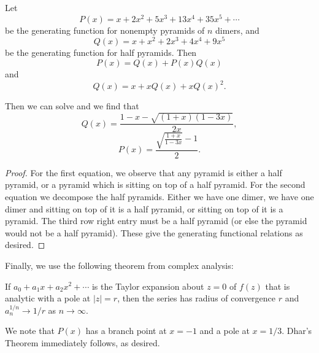 \begin{theorem}
Let 
\[P(x) = x + 2x^2 + 5x^3 + 13x^4 + 35x^5 + \cdots\] be the generating function for nonempty pyramids of $n$ dimers, and 
\[Q(x) = x + x^2 + 2x^3 + 4x^4 + 9x^5\]
be the generating function for half pyramids. Then
\[P(x) = Q(x) + P(x)Q(x)\] and
\[Q(x) = x + xQ(x) + xQ(x)^2.\]

Then we can solve and we find that 
\[Q(x) = \frac{1 - x - \sqrt{(1 + x)(1 - 3x)}}{2x},\]
\[P(x) = \frac{\sqrt{\frac{1 + x}{1 - 3x}} - 1}{2}.\]
\end{theorem}
\begin{proof}
For the first equation, we observe that any pyramid is either a half pyramid, or a pyramid which is sitting on top of a half pyramid. For the second equation we decompose the half pyramids. Either we have one dimer, we have one dimer and sitting on top of it is a half pyramid, or sitting on top of it is a pyramid. The third row right entry must be a half pyramid (or else the pyramid would not be a half pyramid). These give the generating functional relations as desired.
\end{proof}

Finally, we use the following theorem from complex analysis:
\begin{theorem}
If $a_0 + a_1x + a_2x^2 + \cdots$ is the Taylor expansion about $z = 0$ of $f(z)$ that is analytic with a pole at $|z| = r$, then the series has radius of convergence $r$ and $a_n^{1/n} \to 1/r$ as $n \to \infty$.
\end{theorem}

We note that $P(x)$ has a branch point at $x = -1$ and a pole at $x = 1/3$. Dhar's Theorem immediately follows, as desired.
